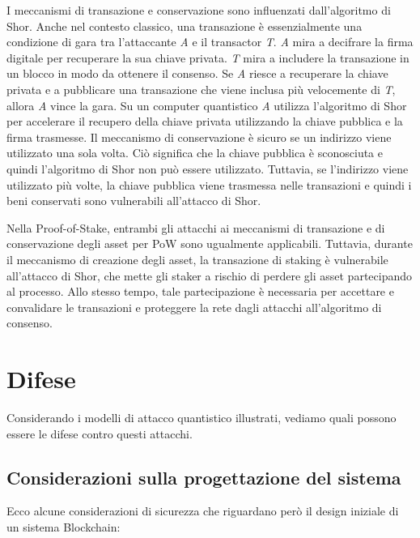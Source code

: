 I meccanismi di transazione e conservazione sono influenzati dall'algoritmo di Shor. Anche nel contesto classico, una transazione è essenzialmente una condizione di gara tra l'attaccante \textit{A} e il transactor \textit{T}. \textit{A} mira a decifrare la firma digitale per recuperare la sua chiave privata. \textit{T} mira a includere la transazione in un blocco in modo da ottenere il consenso. Se \textit{A} riesce a recuperare la chiave privata e a pubblicare una transazione che viene inclusa più velocemente di \textit{T}, allora \textit{A} vince la gara. Su un computer quantistico \textit{A} utilizza l'algoritmo di Shor per accelerare il recupero della chiave privata utilizzando la chiave pubblica e la firma trasmesse. Il meccanismo di conservazione è sicuro se un indirizzo viene utilizzato una sola volta. Ciò significa che la chiave pubblica è sconosciuta e quindi l'algoritmo di Shor non può essere utilizzato. Tuttavia, se l'indirizzo viene utilizzato più volte, la chiave pubblica viene trasmessa nelle transazioni e quindi i beni conservati sono vulnerabili all'attacco di Shor.

Nella Proof-of-Stake, entrambi gli attacchi ai meccanismi di transazione e di conservazione degli asset per PoW sono ugualmente applicabili. Tuttavia, durante il meccanismo di creazione degli asset, la transazione di staking è vulnerabile all'attacco di Shor, che mette gli staker a rischio di perdere gli asset partecipando al processo. Allo stesso tempo, tale partecipazione è necessaria per accettare e convalidare le transazioni e proteggere la rete dagli attacchi all'algoritmo di consenso.

\section{Difese}
Considerando i modelli di attacco quantistico illustrati, vediamo quali possono essere le difese contro questi attacchi.

\subsection{Considerazioni sulla progettazione del sistema}
Ecco alcune considerazioni di sicurezza che riguardano però il design iniziale di un sistema Blockchain:

